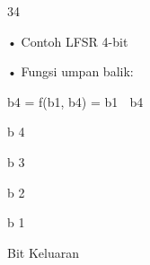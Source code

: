 \documentclass{article}
\begin{document}

34

• Contoh LFSR 4-bit 

• Fungsi umpan balik: 


b4 = f(b1, b4) = b1  b4

b 4

b 3

b 2

b 1

Bit Keluaran
\end{document}
